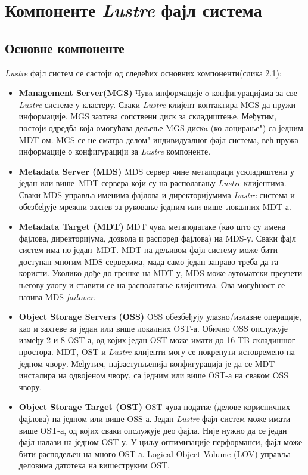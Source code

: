 \newpage
\section{Компоненте  \textit{Lustre}  фајл система}
\subsection{Основне компоненте}
\textit{Lustre} фајл систем се састоји од следећих основних компоненти(слика 2.1):
\begin{itemize}
\item
\textbf{Management Server(MGS)} 
 Чувa информације o конфигурацијама за све \textit{Lustre} системе у кластерy. Сваки \textit{Lustre} клијент контактира MGS да пружи информације. MGS захтева сопствени диск за складиштење. Међутим, постоји одредба која омогућава дељење MGS дискa (\zn ко-лоцирање") са једним MDT-ом. MGS се не сматра \zn делом" индивидуалног фајл система, већ пружа информације о конфигурацији за \textit{Lustre} компоненте.
 
\item 
\textbf{Metadata Server (\gls{MDS})} 
 MDS сервер чине метаподаци ускладиштени у један или више MDT сервера који су на располагању \textit{Lustre} клијентима. Сваки MDS  управља именима фајлова и директоријумима \textit{Lustre} система и обезбеђује мрежни захтев за руковање једним или више локалних MDT-а.

\item 
\textbf{Metadata Target (\gls{MDT})} 
 MDT чувa метаподатаке (као што су имена фајлова, директоријума, дозвола и распоред фајлова) на MDS-у. Сваки фајл систем има по један MDT. MDT на дељивом фајл систему може бити доступан многим MDS серверима, мада само један заправо треба да га користи. Уколико дође до грешке на MDT-у, MDS може аутоматски преузети његову улогу и ставити се на располагање клијентима. Ова могућност се назива MDS \textit{ failover}.

\item 
\textbf{Object Storage Servers (\gls{OSS})} 
 OSS обезбеђују улазно/излазне операције, као и захтеве за један или више локалних OST-а. Обично OSS опслужује између 2 и 8 OST-а, од којих један OST може имати до 16 TB складишног простора.  MDT, OST и \textit{Lustre} клијенти могу се покренути истовремено на једном чвору. Међутим, најзаступљенија конфигурација је да се MDT инсталира на одвојеном чвору, са једним или више OST-а на сваком OSS чвору.

\item 
\textbf{Object Storage Target (\gls{OST})} 
 OST чува податке (делове корисничних фајлова) на једном или више OSS-а. Један \textit{Lustre} фајл систем може имати више OST-а, од којих сваки опслужује део фајла. Није нужно да се један фајл налази на једном OST-у. У циљу оптимизације перформанси, фајл може бити расподељен на много OST-а. Logical Object Volume (LOV) управља деловима датотека на вишеструким OST.


\end{itemize}
